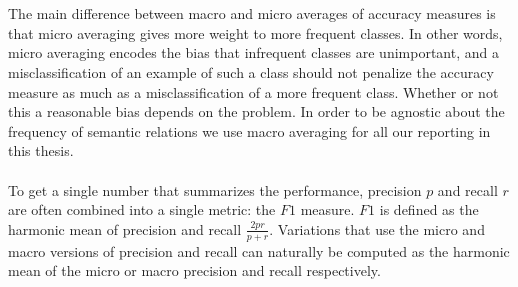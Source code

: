 \\\\
The main difference between macro and micro averages of accuracy measures is that micro averaging gives more weight to more frequent classes. In other words, micro averaging encodes the bias that infrequent classes are unimportant, and a misclassification of an example of such a class should not penalize the accuracy measure as much as a misclassification of a more frequent class. Whether or not this a reasonable bias depends on the problem. In order to be agnostic about the frequency of semantic relations we use macro averaging for all our reporting in this thesis.
\\\\
To get a single number that summarizes the performance, precision $p$ and recall $r$ are often combined into a single metric: the $F1$ measure. $F1$ is defined as the harmonic mean of precision and recall $\frac{2pr}{p + r}$. Variations that use the micro and macro versions of precision and recall can naturally be computed as the harmonic mean of the micro or macro precision and recall respectively.